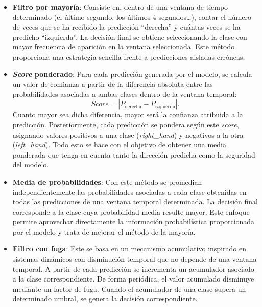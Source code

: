\begin{itemize}
    \item \textbf{Filtro por mayoría}: Consiste en, dentro de una ventana de tiempo determinado (el último segundo, los últimos 4 segundos\dots), contar el número de veces que se ha recibido la predicción ``derecha'' y cuántas veces se ha predicho ``izquierda''. La decisión final se obtiene seleccionando la clase con mayor frecuencia de aparición en la ventana seleccionada. Este método proporciona una estrategia sencilla frente a predicciones aisladas erróneas.
    \item \textbf{\textit{Score} ponderado}:  Para cada predicción generada por el modelo, se calcula un valor de confianza a partir de la diferencia absoluta entre las probabilidades asociadas a ambas clases dentro de la ventana temporal:
    \[\textit{Score} = \left|P_{\text{derecha}} - P_{\text{izquierda}}\right|.\]
    Cuanto mayor sea dicha diferencia, mayor será la confianza atribuida a la predicción. Posteriormente, cada predicción se pondera según este \textit{score}, asignando valores positivos a una clase (\textit{right\_hand}) y negativos a la otra (\textit{left\_hand}). Todo esto se hace con el objetivo de obtener una media ponderada que tenga en cuenta tanto la dirección predicha como la seguridad del modelo.
    \item \textbf{Media de probabilidades}: Con este método se promedian independientemente las probabilidades asociadas a cada clase obtenidas en todas las predicciones de una ventana temporal determinada. La decisión final corresponde a la clase cuya probabilidad media resulte mayor. Este enfoque permite aprovechar directamente la información probabilística proporcionada por el modelo y trata de mejorar el método de la mayoría.
    \item \textbf{Filtro con fuga}: Este se basa en un mecanismo acumulativo inspirado en sistemas dinámicos con disminución temporal que no depende de una ventana temporal. A partir de cada predicción se incrementa un acumulador asociado a la clase correspondiente. De forma periódica, el valor acumulado disminuye mediante un factor de fuga. Cuando el acumulador de una clase supera un determinado umbral, se genera la decisión correspondiente.

\end{itemize}
